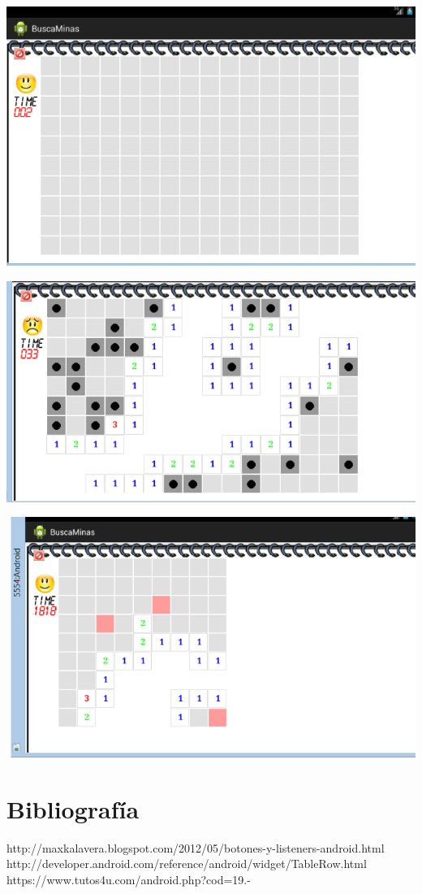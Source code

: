 \begin{center}

\includegraphics{image_buscamina/pantallaJuegoInicio}

\includegraphics{image_buscamina/pantallaJuego}

\includegraphics{image_buscamina/banderas}


\end{center}

\section{Bibliografía}

\begin{thebibliography}{99}
http://maxkalavera.blogspot.com/2012/05/botones-y-listeners-android.html
http://developer.android.com/reference/android/widget/TableRow.html
https://www.tutos4u.com/android.php?cod=19.-%
\end{thebibliography}
